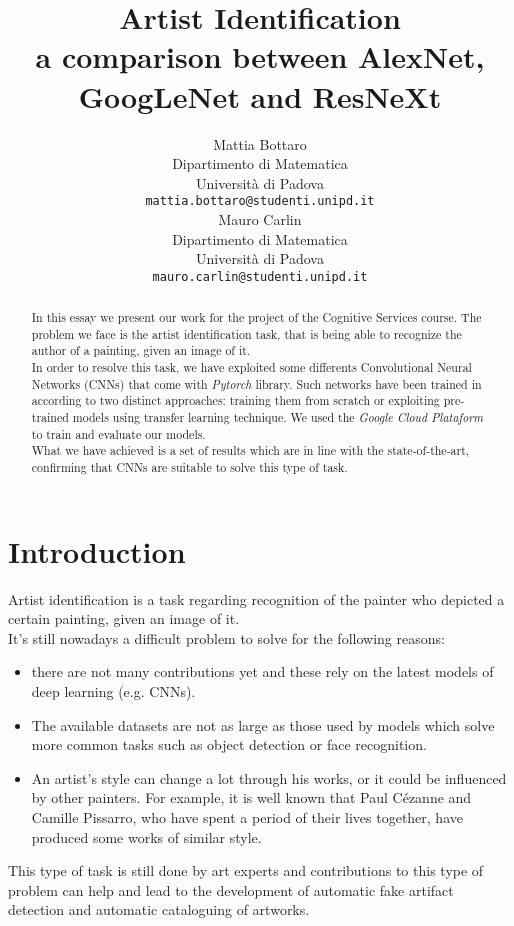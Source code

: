 \documentclass{article}
\title{Artist Identification	\\  a comparison between AlexNet, GoogLeNet and ResNeXt}
\author{
  Mattia Bottaro \\
  Dipartimento  di Matematica\\
  Università di Padova \\
  \texttt{mattia.bottaro@studenti.unipd.it} \\
   \And
  Mauro Carlin \\
Dipartimento  di Matematica\\
Università di Padova \\
\texttt{mauro.carlin@studenti.unipd.it} \\
}
\begin{document}
\maketitle

\begin{abstract}
	In this essay we present our work for the project of the Cognitive Services course.
	The problem we face is the artist identification task, that is being able to recognize the author of a painting, given an image of it.\\
	In order to resolve this task, we have exploited some differents Convolutional Neural Networks (CNNs) that come with \textit{Pytorch} library. Such networks have been trained in according to two distinct approaches: training them from scratch or exploiting pre-trained models using transfer learning technique. We used the \textit{Google Cloud Plataform} to train and evaluate our models.\\
	What we have achieved is a set of results which are in line with the  state-of-the-art, confirming that CNNs are suitable to solve this type of task.
\end{abstract}




\section{Introduction}
Artist identification is a task regarding recognition of the painter who depicted a certain painting, given an image of it.\\
It's still nowadays a difficult problem to solve for the following reasons:
\begin{itemize}
	\item there are not many contributions yet and these rely on the latest models of deep learning (e.g. CNNs). 
	\item The available datasets are not as large as those used by models which solve more common tasks such as object detection or face recognition.
	\item An artist's style can change a lot through his works, or it could be influenced by other painters. For example, it is well known that Paul Cézanne and Camille Pissarro, who have spent a period of their lives together, have produced some works of similar style.
\end{itemize}
This type of task is still done by art experts and contributions to this type of problem can help and lead to the development of automatic fake artifact detection and automatic cataloguing of artworks.\\
\end{document}
